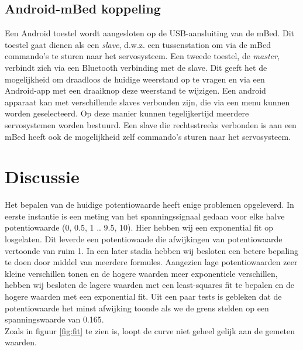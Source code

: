 \documentclass[a4paper,12pt]{article}
\begin{document}
\subsection{Android-mBed koppeling}
Een Android toestel wordt aangesloten op de USB-aansluiting van de mBed. Dit toestel gaat dienen als een \textit{slave}, d.w.z. een tussenstation om via de mBed commando's te sturen naar het servosysteem. Een tweede toestel, de \textit{master}, verbindt zich via een Bluetooth verbinding met de slave. Dit geeft het de mogelijkheid om draadloos de huidige weerstand op te vragen en via een Android-app met een draaiknop deze weerstand te wijzigen. Een android apparaat kan met verschillende slaves verbonden zijn, die via een menu kunnen worden geselecteerd. Op deze manier kunnen tegelijkertijd meerdere servosystemen worden bestuurd. Een slave die rechtsstreeks verbonden is aan een mBed heeft ook de mogelijkheid zelf commando's sturen naar het servosysteem.




\section{Discussie}
Het bepalen van de huidige potentiowaarde heeft enige problemen opgeleverd. In eerste instantie is een meting van het spanningssignaal gedaan voor elke halve potentiowaarde (0, 0.5, 1 .. 9.5, 10). Hier hebben wij een exponential fit op losgelaten. Dit leverde een potentiowaade die afwijkingen van potentiowaarde vertoonde van ruim 1. In een later stadia hebben wij besloten een betere bepaling te doen door middel van meerdere formules. Aangezien lage potentiowaarden zeer kleine verschillen tonen en de hogere waarden meer exponentiele verschillen, hebben wij besloten de lagere waarden met een least-squares fit te bepalen en de hogere waarden met een exponential fit. Uit een paar tests is gebleken dat de potentiowaarde het minst afwijking toonde als we de grens stelden op een spanningswaarde van 0.165.\\
Zoals in figuur \ref{fig:fit} te zien is, loopt de curve niet geheel gelijk aan de gemeten waarden.
\end{document}
